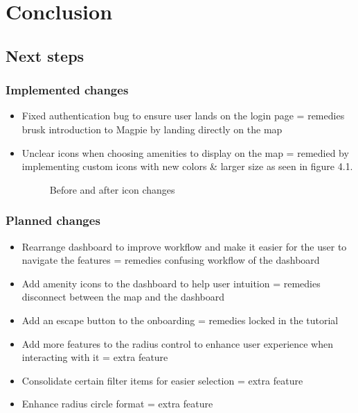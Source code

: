 \documentclass{report}
\begin{document}
\chapter{Conclusion}
\section{Next steps}
\subsection{Implemented changes}
\begin{itemize}
    \item Fixed authentication bug to ensure user lands on the login page = remedies brusk introduction to Magpie by landing directly on the map
    \item Unclear icons when choosing amenities to display on the map = remedied by implementing custom icons with new colors \& larger size as seen in figure 4.1.
          \begin{figure}
              \centering
              \caption{Before and after icon changes}
              \label{fig:plot13}
          \end{figure}
\end{itemize}
\subsection{Planned changes}
\begin{itemize}
    \item Rearrange dashboard to improve workflow and make it easier for the user to navigate the features = remedies confusing workflow of the dashboard
    \item Add amenity icons to the dashboard to help user intuition = remedies disconnect between the map and the dashboard
    \item Add an escape button to the onboarding = remedies locked in the tutorial
    \item Add more features to the radius control to enhance user experience when interacting with it = extra feature
    \item Consolidate certain filter items for easier selection = extra feature
    \item Enhance radius circle format = extra feature
\end{itemize}
\end{document}
